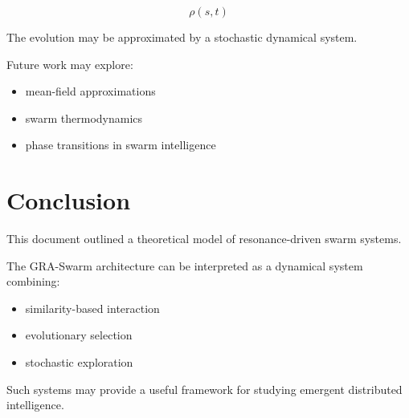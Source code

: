 \documentclass[11pt]{article}
\begin{document}
\[
\rho(s,t)
\]

The evolution may be approximated by a stochastic dynamical system.

Future work may explore:

\begin{itemize}

\item mean-field approximations
\item swarm thermodynamics
\item phase transitions in swarm intelligence
\end{itemize}

\section{Conclusion}

This document outlined a theoretical model of resonance-driven swarm systems.

The GRA-Swarm architecture can be interpreted as a dynamical system combining:

\begin{itemize}

\item similarity-based interaction
\item evolutionary selection
\item stochastic exploration
\end{itemize}

Such systems may provide a useful framework for studying emergent distributed intelligence.
\end{document}
